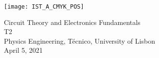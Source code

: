 
\thispagestyle {empty}

\texttt{[image: IST\_A\_CMYK\_POS]}

\begin{center}
%
\vspace{1.0cm}

\vspace{1cm}
{\FontLb Circuit Theory and Electronics Fundamentals} \\ %
\vspace{1cm}
{\FontLb T2} \\
\vspace{1cm}
{\FontSn Physics Engineering, Técnico, University of Lisbon} \\ %
\vspace{1cm}
{\FontSn April 5, 2021} \\ %
%
\end{center}

